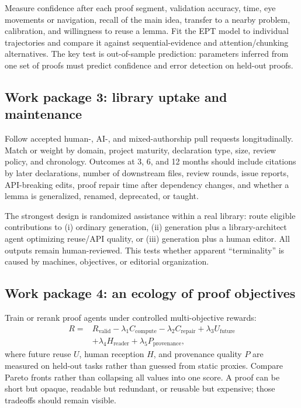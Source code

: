 \documentclass[11pt]{article}
\begin{document}
Measure confidence after each proof segment, validation accuracy, time, eye movements or navigation,
recall of the main idea, transfer to a nearby problem, calibration, and willingness to reuse a lemma.
Fit the EPT model to individual trajectories and compare it against sequential-evidence and
attention/chunking alternatives.  The key test is out-of-sample prediction: parameters inferred from
one set of proofs must predict confidence and error detection on held-out proofs.

\subsection{Work package 3: library uptake and maintenance}

Follow accepted human-, AI-, and mixed-authorship pull requests longitudinally.  Match or weight by
domain, project maturity, declaration type, size, review policy, and chronology.  Outcomes at 3, 6,
and 12 months should include citations by later declarations, number of downstream files, review
rounds, issue reports, API-breaking edits, proof repair time after dependency changes, and whether a
lemma is generalized, renamed, deprecated, or taught.

The strongest design is randomized assistance within a real library: route eligible contributions
to (i) ordinary generation, (ii) generation plus a library-architect agent optimizing reuse/API
quality, or (iii) generation plus a human editor.  All outputs remain human-reviewed.  This tests
whether apparent ``terminality'' is caused by machines, objectives, or editorial organization.

\subsection{Work package 4: an ecology of proof objectives}

Train or rerank proof agents under controlled multi-objective rewards:
\begin{align*}
R ={}& R_{\mathrm{valid}} - \lambda_1 C_{\mathrm{compute}}
      - \lambda_2 C_{\mathrm{repair}} + \lambda_3 U_{\mathrm{future}}\\
    &+ \lambda_4 H_{\mathrm{reader}} + \lambda_5 P_{\mathrm{provenance}},
\end{align*}
where future reuse $U$, human reception $H$, and provenance quality $P$ are measured on held-out
tasks rather than guessed from static proxies.  Compare Pareto fronts rather than collapsing all
values into one score.  A proof can be short but opaque, readable but redundant, or reusable but
expensive; those tradeoffs should remain visible.
\end{document}
